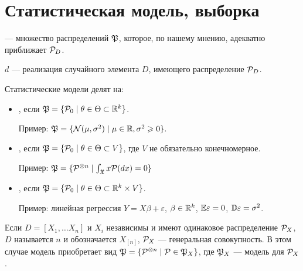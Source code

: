 \documentclass[11pt]{book}
\begin{document}
\section{Статистическая модель, выборка}
\begin{definition}[]
	 --- множество распределений $\PP$, которое, по нашему мнению, адекватно приближает $\P_D$. 
\end{definition}
\begin{definition}[]
	 $d$ --- реализация случайного элемента $D$, имеющего распределение $\P_D$.
\end{definition}
Статистические модели делят на:
\begin{itemize}
	\item {}, если $\PP = \{\P_0 \mid \theta \in \Theta \subset \R^{k}\}$.

		Пример: $\PP = \{\N(\mu, \sigma^2) \mid \mu \in \R, \sigma^2 \ge 0\}$.
	\item {}, если $\PP = \{\P_0 \mid \theta \in  \Theta \subset V\}$, где $V$ не обязательно конечномерное.

		Пример: $\PP = \{\P^{\otimes n} \mid \int_{\mathfrak{X}}^{} x \P(dx) = 0 \}$
	\item {}, если $\PP = \{\P_0 \mid \theta \in \Theta \subset \R^{k} \times V\}$.

		Пример: линейная регрессия $Y = X \beta + \varepsilon$, $\beta \in \R^{k}$, $\E \varepsilon = 0$, $\D \varepsilon = \sigma^2$.
\end{itemize}
Если $D = [X_1, \ldots X_n]$ и $X_i$ независимы и имеют одинаковое распределение $\P_{X}$, $D$ называется  $n$ и обозначается $X_{[n]}$, $\P_{X}$ --- генеральная совокупность.
В этом случае модель приобретает вид
$ \PP = \{\P^{\otimes n} \mid \P \in \PP_X\} $, где $\PP_X$ --- модель для $\P_X$.
\end{document}

